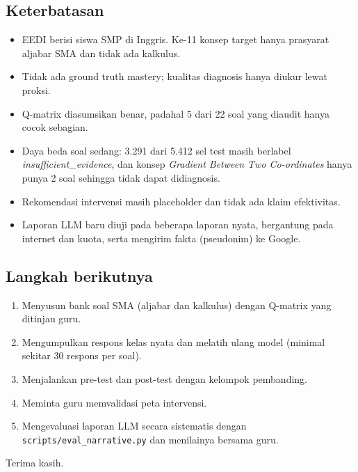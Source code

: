 \documentclass[11pt,a4paper]{article}
\begin{document}
\subsection{Keterbatasan}
\begin{itemize}
  \item EEDI berisi siswa SMP di Inggris. Ke-11 konsep target hanya prasyarat aljabar SMA dan tidak ada kalkulus.
  \item Tidak ada ground truth mastery; kualitas diagnosis hanya diukur lewat proksi.
  \item Q-matrix diasumsikan benar, padahal 5 dari 22 soal yang diaudit hanya cocok sebagian.
  \item Daya beda soal sedang: 3.291 dari 5.412 sel test masih berlabel \emph{insufficient\_evidence}, dan konsep
        \emph{Gradient Between Two Co-ordinates} hanya punya 2 soal sehingga tidak dapat didiagnosis.
  \item Rekomendasi intervensi masih placeholder dan tidak ada klaim efektivitas.
  \item Laporan LLM baru diuji pada beberapa laporan nyata, bergantung pada internet dan kuota, serta mengirim fakta
        (pseudonim) ke Google.
\end{itemize}

\subsection{Langkah berikutnya}
\begin{enumerate}
  \item Menyusun bank soal SMA (aljabar dan kalkulus) dengan Q-matrix yang ditinjau guru.
  \item Mengumpulkan respons kelas nyata dan melatih ulang model (minimal sekitar 30 respons per soal).
  \item Menjalankan pre-test dan post-test dengan kelompok pembanding.
  \item Meminta guru memvalidasi peta intervensi.
  \item Mengevaluasi laporan LLM secara sistematis dengan \texttt{scripts/eval\_narrative.py} dan menilainya bersama
        guru.
\end{enumerate}

\vspace{1em}
\noindent Terima kasih.

\appendix
\end{document}
